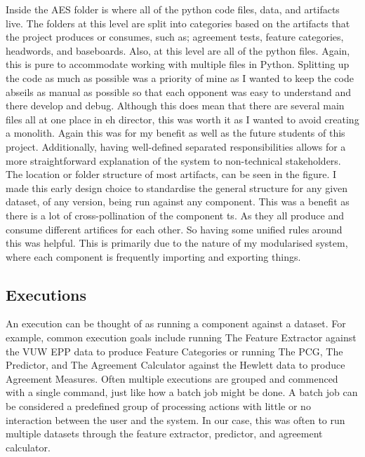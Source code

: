 Inside the AES folder is where all of the python code files, data, and artifacts live. The folders at this level are split into categories based on the artifacts that the project produces or consumes, such as; agreement tests, feature categories, headwords, and baseboards. Also, at this level are all of the python files. Again, this is pure to accommodate working with multiple files in Python. Splitting up the code as much as possible was a priority of mine as I wanted to keep the code abseils as manual as possible so that each opponent was easy to understand and there develop and debug. Although this does mean that there are several main files all at one place in eh director, this was worth it as I wanted to avoid creating a monolith. Again this was for my benefit as well as the future students of this project. Additionally, having well-defined separated responsibilities allows for a more straightforward explanation of the system to non-technical stakeholders. The location or folder structure of most artifacts, can be seen in the figure. I made this early design choice to standardise the general structure for any given dataset, of any version, being run against any component. This was a benefit as there is a lot of cross-pollination of the component ts. As they all produce and consume different artifices for each other. So having some unified rules around this was helpful. This is primarily due to the nature of my modularised system, where each component is frequently importing and exporting things.


\subsection{Executions}
An execution can be thought of as running a component against a dataset. For example, common execution goals include running The Feature Extractor against the VUW EPP data to produce Feature Categories or running The PCG, The Predictor, and The Agreement Calculator against the Hewlett data to produce Agreement Measures. Often multiple executions are grouped and commenced with a single command, just like how a batch job might be done. A batch job can be considered a predefined group of processing actions with little or no interaction between the user and the system. In our case, this was often to run multiple datasets through the feature extractor, predictor, and agreement calculator. 


